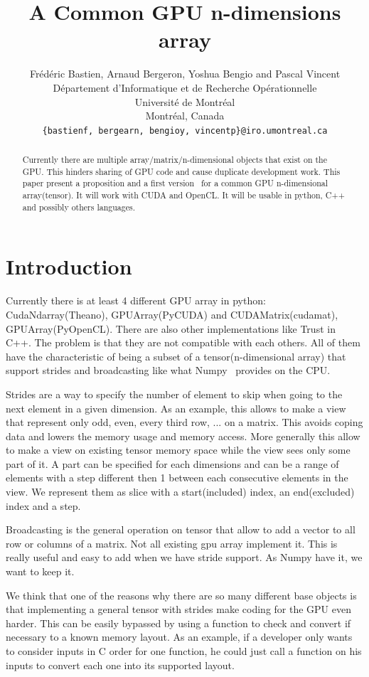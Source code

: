 \documentclass{article} %
\title{A Common GPU n-dimensions array}
\author{
Frédéric Bastien, Arnaud Bergeron, Yoshua Bengio and Pascal Vincent \\
D\'epartement d'Informatique et de Recherche Op\'erationnelle\\
Universit\'e de Montr\'eal\\
Montr\'eal, Canada \\
\texttt{\{bastienf, bergearn, bengioy, vincentp\}@iro.umontreal.ca} \\
}
\begin{document}
\maketitle

\begin{abstract}
Currently there are multiple array/matrix/n-dimensional objects
that exist on the GPU.  This hinders sharing of GPU code and cause
duplicate development work. This paper present a proposition and a
first version~\citep{GpuNdArray} for a common GPU n-dimensional
array(tensor). It will work with CUDA and OpenCL. It will be
usable in python, C++ and possibly others languages.
\end{abstract}

\section{Introduction}
Currently there is at least 4 different GPU array in python:
CudaNdarray(Theano), GPUArray(PyCUDA) and CUDAMatrix(cudamat),
GPUArray(PyOpenCL). There are also other implementations like Trust in
C++.  The problem is that they are not compatible with each
others. All of them have the characteristic of being a subset of a
tensor(n-dimensional array) that support strides and broadcasting like
what Numpy~\citep{numpy-2007} provides on the CPU.

Strides are a way to specify the number of element to skip when going
to the next element in a given dimension.  As an example, this allows
to make a view that represent only odd, even, every third row, ... on
a matrix. This avoids coping data and lowers the memory usage and memory
access. More generally this allow to make a view on existing tensor
memory space while the view sees only some part of it. A part can be
specified for each dimensions and can be a range of elements with a
step different then 1 between each consecutive elements in the
view. We represent them as slice with a start(included) index, an
end(excluded) index and a step.

Broadcasting is the general operation on tensor that allow to add a
vector to all row or columns of a matrix. Not all existing gpu array
implement it. This is really useful and easy to add when we have
stride support. As Numpy have it, we want to keep it.

We think that one of the reasons why there are so many different base
objects is that implementing a general tensor with strides
make coding for the GPU even harder. This can be easily bypassed by using
a function to check and convert if necessary to a known memory layout.
As an example, if a developer only wants to consider inputs in C order for one function, he could just call a function on his inputs to
convert each one into its supported layout.
\end{document}
